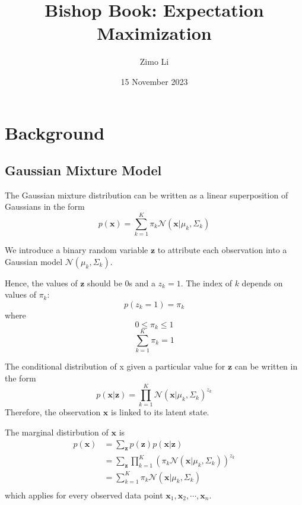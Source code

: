 \documentclass{article}
\title{Bishop Book: Expectation Maximization}
\author{Zimo Li}
\date{15 November 2023}
\begin{document}
\maketitle

\section{Background}
\subsection{Gaussian Mixture Model}
\par\noindent
The Gaussian mixture distribution can be written as a linear superposition
of Gaussians in the form
\[
p(\mathbf{x}) = \sum_{k=1}^{K}\pi_k\mathcal{N}(\mathbf{x}|\mu_k,\Sigma_k)
\]

\par\noindent
We introduce a binary random variable \(\mathbf{z}\) to attribute 
each observation into a Gaussian model \(\mathcal{N}(\mu_k,\Sigma_k)\).
\bigskip

\par\noindent
Hence, the values of \(\mathbf{z}\) should be 0s and a \(z_k=1\). 
The index of \(k\) depends on values of \(\pi_k\):
\[p(z_k=1)=\pi_k\]
where
\[0 \leq \pi_k \leq 1 \]
\[\sum_{k=1}^{K}\pi_k=1 \]
\bigskip

\par\noindent
The conditional distribution of x given a particular value for \(\mathbf{z}\)
can be written in the form
\[
    p(\mathbf{x}|\mathbf{z})
    =\prod_{k=1}^{K}
    \mathcal{N}(\mathbf{x}|\mu_k, \Sigma_k)^{z_k}
\]
Therefore, the observation \(\mathbf{x}\) is linked
to its latent state.
\bigskip

\par\noindent
The marginal distirbution of \(\mathbf{x}\) is
\begin{align*}
    p(\mathbf{x}) &=
    \sum_{\mathbf{z}}^{}p(\mathbf{z})p(\mathbf{x}|\mathbf{z})\\
    &= \sum_{\mathbf{z}}^{}\prod_{k=1}^{K}(\pi_k\mathcal{N}(\mathbf{x}|\mu_k, \Sigma_k))^{z_k}\\
    &=\sum_{k=1}^{K}\pi_k\mathcal{N}(\mathbf{x}|\mu_k, \Sigma_k)\\
\end{align*}
which applies for every observed data point \(\mathbf{x}_1, \mathbf{x}_2, \cdots, \mathbf{x}_n\).
\bigskip
\end{document}
